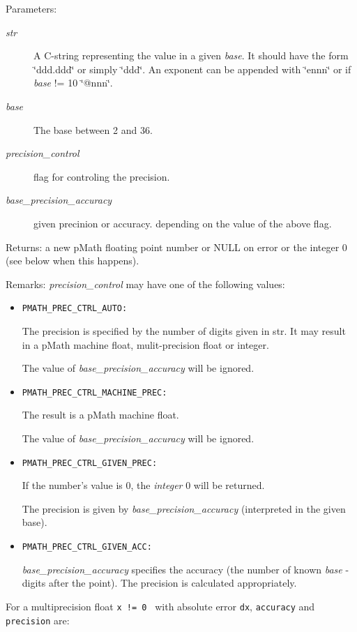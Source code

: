 \begin{Desc}
\item[Parameters:]
\begin{description}
\item[{\em str}]A C-string representing the value in a given {\em base\/}. It should have the form \char`\"{}ddd.ddd\char`\"{} or simply \char`\"{}ddd\char`\"{}. An exponent can be appended with \char`\"{}ennn\char`\"{} or if {\em base\/} != 10 \char`\"{}@nnn\char`\"{}. \item[{\em base}]The base between 2 and 36. \item[{\em precision\_\-control}]flag for controling the precision. \item[{\em base\_\-precision\_\-accuracy}]given precinion or accuracy. depending on the value of the above flag. \end{description}
\end{Desc}
\begin{Desc}
\item[Returns:]a new pMath floating point number or NULL on error or the integer 0 (see below when this happens).\end{Desc}
\begin{Desc}
\item[Remarks:]{\em precision\_\-control\/} may have one of the following values: \begin{itemize}
\item {\tt PMATH\_\-PREC\_\-CTRL\_\-AUTO:} \par
 The precision is specified by the number of digits given in str. It may result in a pMath machine float, mulit-precision float or integer. \par
 The value of {\em base\_\-precision\_\-accuracy\/} will be ignored.

\item {\tt PMATH\_\-PREC\_\-CTRL\_\-MACHINE\_\-PREC:} \par
 The result is a pMath machine float. \par
 The value of {\em base\_\-precision\_\-accuracy\/} will be ignored.

\item {\tt PMATH\_\-PREC\_\-CTRL\_\-GIVEN\_\-PREC:} \par
 If the number's value is 0, the {\em integer\/} 0 will be returned. \par
 The precision is given by {\em base\_\-precision\_\-accuracy\/} (interpreted in the given base).

\item {\tt PMATH\_\-PREC\_\-CTRL\_\-GIVEN\_\-ACC:} \par
 {\em base\_\-precision\_\-accuracy\/} specifies the accuracy (the number of known {\em base\/} -digits after the point). The precision is calculated appropriately. \end{itemize}
\end{Desc}
For a multiprecision float {\tt  x != 0 } with absolute error {\tt dx}, {\tt accuracy} and {\tt precision} are:



